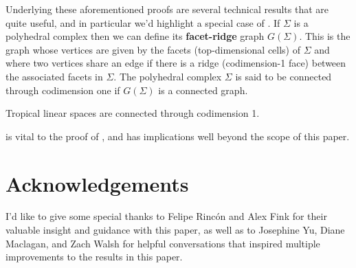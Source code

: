 Underlying these aforementioned proofs are several technical results that are quite useful, and in particular we'd highlight a special case of . If $\Sigma$ is a polyhedral complex then we can define its \textbf{facet-ridge} graph $G(\Sigma)$. This is the graph whose vertices are given by the facets (top-dimensional cells) of $\Sigma$ and where two vertices share an edge if there is a ridge (codimension-1 face) between the associated facets in $\Sigma$. The polyhedral complex $\Sigma$ is said to be connected through codimension one if $G(\Sigma)$ is a connected graph.

\begin{corollary}\label{thm:introThm3}
Tropical linear spaces are connected through codimension 1.
\end{corollary}

 is vital to the proof of , and has implications well beyond the scope of this paper.

\section*{Acknowledgements}
I'd like to give some special thanks to Felipe Rinc\'on and Alex Fink for their valuable insight and guidance with this paper, as well as to Josephine Yu, Diane Maclagan, and Zach Walsh for helpful conversations that inspired multiple improvements to the results in this paper.




